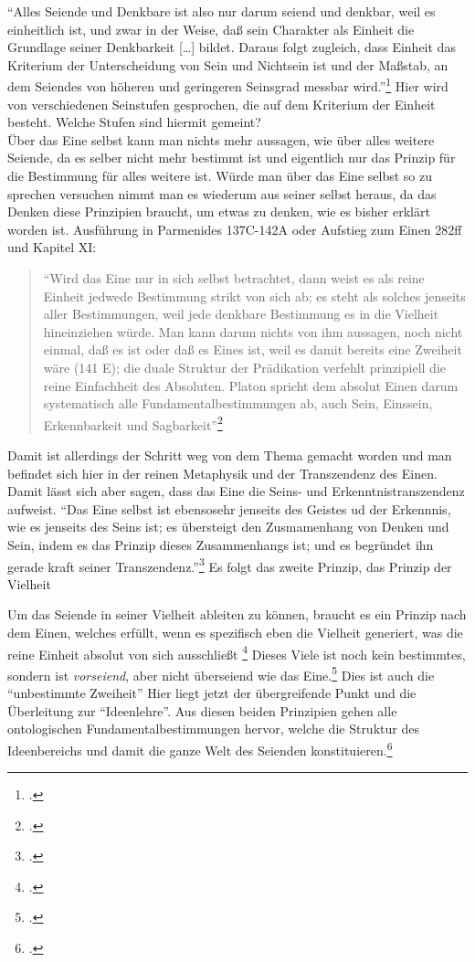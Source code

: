 \documentclass[12pt]{article}
\newcommand*{\zitatblock}[1]{%
    \begin{quote}
    \fontsize{10}{12}\selectfont
    \setlength{\parskip}{1.0em}
    #1
    \end{quote}
}
\begin{document}
\enquote{Alles Seiende und Denkbare ist also nur darum seiend und denkbar, weil es einheitlich ist, und zwar in der Weise, daß sein Charakter als Einheit die Grundlage seiner Denkbarkeit [\dots] bildet. Daraus folgt zugleich, dass Einheit das Kriterium der Unterscheidung von Sein und Nichtsein ist und der Maßstab, an dem Seiendes von höheren und geringeren Seinsgrad messbar wird.}\footcite[vgl.][S. 99]{halfwassen2015spuren}
Hier wird von verschiedenen Seinstufen gesprochen, die auf dem Kriterium der Einheit besteht. Welche Stufen sind hiermit gemeint?\\
Über das Eine selbst kann man nichts mehr aussagen, wie über alles weitere Seiende, da es selber nicht mehr bestimmt ist und eigentlich nur das Prinzip für die Bestimmung für alles weitere ist. Würde man über das Eine selbst so zu sprechen versuchen nimmt man es wiederum aus seiner selbst heraus, da das Denken diese Prinzipien braucht, um etwas zu denken, wie es bisher erklärt worden ist. Ausführung in Parmenides 137C-142A oder Aufstieg zum Einen 282ff und Kapitel XI:
\zitatblock{\enquote{Wird das Eine nur in sich selbst betrachtet, dann weist es als reine Einheit jedwede Bestimmung strikt von sich ab; es steht als solches jenseits aller Bestimmungen, weil jede denkbare Bestimmung es in die Vielheit hineinziehen würde. Man kann darum nichts von ihm aussagen, noch nicht einmal, daß es ist oder daß es Eines ist, weil es damit bereits eine Zweiheit wäre (141 E); die duale Struktur der Prädikation verfehlt prinzipiell die reine Einfachheit des Absoluten. Platon spricht dem absolut Einen darum systematisch alle Fundamentalbestimmungen ab, auch Sein, Einssein, Erkennbarkeit und Sagbarkeit}\footcite[][S. 101]{halfwassen2015spuren}}
Damit ist allerdings der Schritt weg von dem Thema gemacht worden und man befindet sich hier in der reinen Metaphysik und der Transzendenz des Einen. 
Damit lässt sich aber sagen, dass das Eine die Seins- und Erkenntnistranszendenz aufweist. \enquote{Das Eine selbst ist ebensosehr jenseits des Geistes ud der Erkennnis, wie es jenseits des Seins ist; es übersteigt den Zusmamenhang von Denken und Sein, indem es das Prinzip dieses Zusammenhangs ist; und es begründet ihn gerade kraft seiner Transzendenz.}\footcite[][S. 102]{halfwassen2015spuren}
Es folgt das zweite Prinzip, das Prinzip der Vielheit

Um das Seiende in seiner Vielheit ableiten zu können, braucht es ein Prinzip nach dem Einen, welches erfüllt, wenn es spezifisch eben die Vielheit generiert, was die reine Einheit absolut von sich ausschließt \footcite[vgl.][S. 103]{halfwassen2015spuren} Dieses Viele ist noch kein bestimmtes, sondern ist \emph{vorseiend}, aber nicht überseiend wie das Eine.\footcite[vgl.][S. 103]{halfwassen2015spuren} Dies ist auch die \enquote{unbestimmte Zweiheit}
Hier liegt jetzt der übergreifende Punkt und die Überleitung zur \enquote{Ideenlehre}. Aus diesen beiden Prinzipien gehen alle ontologischen Fundamentalbestimmungen hervor, welche die Struktur des Ideenbereichs und damit die ganze Welt des Seienden konstituieren.\footcite[vgl.][S. 104]{halfwassen2015spuren}
\end{document}
